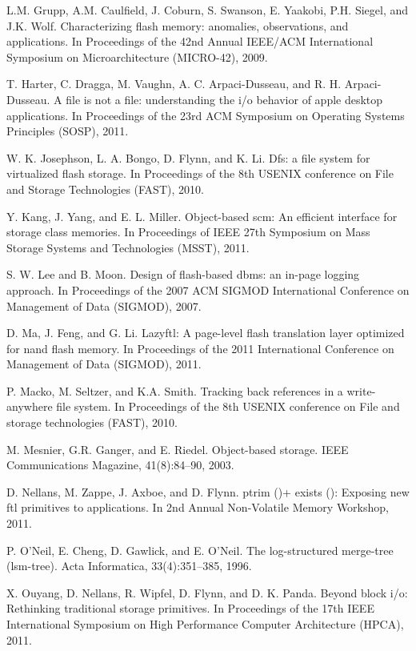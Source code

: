 \begin{translationbib}
\item L.M. Grupp, A.M. Caulfield, J. Coburn, S. Swanson, E. Yaakobi, P.H. Siegel, and J.K. Wolf. Characterizing flash memory: anomalies, observations, and applications. In Proceedings of the 42nd Annual IEEE/ACM International Symposium on Microarchitecture (MICRO-42), 2009.
\item T. Harter, C. Dragga, M. Vaughn, A. C. Arpaci-Dusseau, and R. H. Arpaci-Dusseau. A file is not a file: understanding the i/o behavior of apple desktop applications. In Proceedings of the 23rd ACM Symposium on Operating Systems Principles (SOSP), 2011.
\item W. K. Josephson, L. A. Bongo, D. Flynn, and K. Li. Dfs: a file system for virtualized flash storage. In Proceedings of the 8th USENIX conference on File and Storage Technologies (FAST), 2010.
\item Y. Kang, J. Yang, and E. L. Miller. Object-based scm: An efficient interface for storage class memories. In Proceedings of IEEE 27th Symposium on Mass Storage Systems and Technologies (MSST), 2011.
\item S. W. Lee and B. Moon. Design of flash-based dbms: an in-page logging approach. In Proceedings of the 2007 ACM SIGMOD International Conference on Management of Data (SIGMOD), 2007.
\item D. Ma, J. Feng, and G. Li. Lazyftl: A page-level flash translation layer optimized for nand flash memory. In Proceedings of the 2011 International Conference on Management of Data (SIGMOD), 2011.
\item P. Macko, M. Seltzer, and K.A. Smith. Tracking back references in a write-anywhere file system. In Proceedings of the 8th USENIX conference on File and storage technologies (FAST), 2010.
\item M. Mesnier, G.R. Ganger, and E. Riedel. Object-based storage. IEEE Communications Magazine, 41(8):84–90, 2003.
\item D. Nellans, M. Zappe, J. Axboe, and D. Flynn. ptrim ()+ exists (): Exposing new ftl primitives to applications. In 2nd Annual Non-Volatile Memory Workshop, 2011.
\item P. O’Neil, E. Cheng, D. Gawlick, and E. O’Neil. The log-structured merge-tree (lsm-tree). Acta Informatica, 33(4):351–385, 1996.
\item X. Ouyang, D. Nellans, R. Wipfel, D. Flynn, and D. K. Panda. Beyond block i/o: Rethinking traditional storage primitives. In Proceedings of the 17th IEEE International Symposium on High Performance Computer Architecture (HPCA), 2011.

\end{translationbib}

